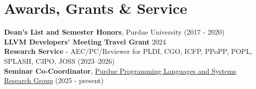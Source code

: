 \documentclass[10pt,letterpaper]{article}
\begin{document}
\section*{Awards, Grants \& Service}
\textbf{Dean’s List and Semester Honors}, Purdue University \hfill (2017 - 2020)\\
\textbf{LLVM Developers’ Meeting Travel Grant} \hfill 2024\\ 
\textbf{Research Service} - AEC/PC/Reviewer for PLDI, CGO, ICFP, PPoPP, POPL, SPLASH, C3PO, JOSS \hfill (2023–2026)\\
\textbf{Seminar Co-Coordinator}, \textcolor{ultramarineblue}{\href{https://purduepl.github.io/index.html}{Purdue Programming Languages and Systems Research Group}} \hfill(2025 - present)\\
\end{document}
